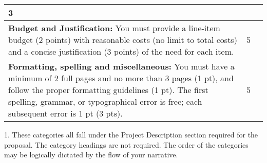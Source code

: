 \documentclass[10pt]{article}
\begin{document}
{\begin{longtable}[l]{@{}L{11cm}C{3cm}L{1cm}@{}}
3 & \\
\midrule%
\textbf{Budget and Justification:} You must provide a line-item budget (2 points) with reasonable costs (no limit to total costs) and a concise justification (3 points) of the need for each item.  &
5 & \\
\midrule%
\textbf{Formatting, spelling and miscellaneous:} You must have a minimum of 2 full pages and no more than 3 pages (1 pt), and follow the proper formatting guidelines (1 pt).  The first spelling, grammar, or typographical error is free; each subsequent error is 1 pt (3 pts).   &
5 & \\
%
\bottomrule
\end{longtable}
\vspace{-1\baselineskip}
1. These categories all fall under the Project Description section required for the proposal.  The category headings are not required.  The order of the categories may be logically dictated by the flow of your narrative.}
\end{document}
